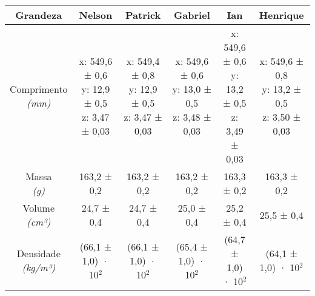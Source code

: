 \documentclass{article}
\begin{document}
\begin{table}[h!]
\centering
\begin{tabular}{c c c c c c }
\toprule
Grandeza & Nelson & Patrick & Gabriel & Ian & Henrique\\
\midrule
\shortstack{Comprimento\\\textit{(mm)}} & \shortstack{x: 549,6 ± 0,6\\y: 12,9 ± 0,5\\z: 3,47 ± 0,03} & \shortstack{x: 549,4 ± 0,8\\y: 12,9 ± 0,5\\z: 3,47 ± 0,03} & \shortstack{x: 549,6 ± 0,6\\y: 13,0 ± 0,5\\z: 3,48 ± 0,03} & \shortstack{x: 549,6 ± 0,6\\y: 13,2 ± 0,5\\z: 3,49 ± 0,03} & \shortstack{x: 549,6 ± 0,8\\y: 13,2 ± 0,5\\z: 3,50 ± 0,03}\\[4pt]
\shortstack{Massa\\\textit{(g)}} & 163,2 ± 0,2 & 163,2 ± 0,2 & 163,2 ± 0,2 & 163,3 ± 0,2 & 163,3 ± 0,2\\[4pt]
\shortstack{Volume\\\textit{(cm³)}} & 24,7 ± 0,4 & 24,7 ± 0,4 & 25,0 ± 0,4 & 25,2 ± 0,4 & 25,5 ± 0,4\\[4pt]
\shortstack{Densidade\\\textit{(kg/m³)}} & (66,1 ± 1,0) · 10$^{2}$ & (66,1 ± 1,0) · 10$^{2}$ & (65,4 ± 1,0) · 10$^{2}$ & (64,7 ± 1,0) · 10$^{2}$ & (64,1 ± 1,0) · 10$^{2}$\\[4pt]
\bottomrule
\end{tabular}
\end{table}
\end{document}
